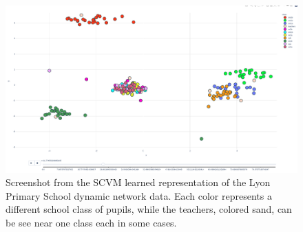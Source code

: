 \begin{figure}[H]
    \centering
    \includegraphics[width=\textwidth]{0_images/lyon_screenshot.png}
    \caption{Screenshot from the SCVM learned representation of the Lyon Primary School dynamic network data. Each color represents a different school class of pupils, while the teachers, colored sand, can be see near one class each in some cases.}
    \label{fig:LyonScreenshot}
\end{figure}